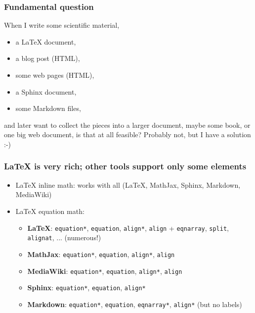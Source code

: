 \documentclass{beamer}
\begin{document}
\begin{frame}
\frametitle{Fundamental question}

When I write some scientific material,
\begin{itemize}
 \item a {\LaTeX} document,
 \item a blog post (HTML),
 \item some web pages (HTML),
 \item a Sphinx document,
 \item some Markdown files,
\end{itemize}
\noindent
and later want to collect the pieces into a larger document, maybe
some book, or one big web document, is that at all feasible?
\pause
Probably not, but I have a solution :-)
\end{frame}

\begin{frame}
\frametitle{{\LaTeX} is very rich; other tools support only some elements}

\begin{itemize}
 \item {\LaTeX} inline math: works with all ({\LaTeX}, MathJax, Sphinx, Markdown, MediaWiki)
 \item {\LaTeX} equation math:
\begin{itemize}
    \item \textbf{LaTeX}: \texttt{equation*}, \texttt{equation}, \texttt{align*}, \texttt{align} + \texttt{eqnarray}, \texttt{split}, \texttt{alignat}, ... (numerous!)
    \item \textbf{MathJax}: \texttt{equation*}, \texttt{equation}, \texttt{align*}, \texttt{align}
    \item \textbf{MediaWiki}: \texttt{equation*}, \texttt{equation}, \texttt{align*}, \texttt{align}
    \item \textbf{Sphinx}: \texttt{equation*}, \texttt{equation}, \texttt{align*}
    \item \textbf{Markdown}: \texttt{equation*}, \texttt{equation}, \texttt{eqnarray*}, \texttt{align*} (but no labels)
\end{itemize}
\noindent
\end{itemize}
\noindent
\end{frame}
\end{document}
